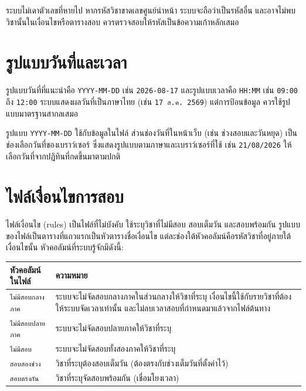 \begin{caution}
ระบบไม่เดาตัวเลขที่หายไป หากรหัสวิชาขาดเลขศูนย์นำหน้า ระบบจะถือว่าเป็นรหัสอื่น
และอาจไม่พบวิชานั้นในเงื่อนไขหรือตารางสอบ ควรตรวจสอบให้รหัสเป็นข้อความเก้าหลักเสมอ
\end{caution}

\section{รูปแบบวันที่และเวลา}

รูปแบบวันที่ที่แนะนำคือ \texttt{YYYY-MM-DD} เช่น \texttt{2026-08-17}
และรูปแบบเวลาคือ \texttt{HH:MM} เช่น \texttt{09:00} ถึง \texttt{12:00}
ระบบแสดงผลวันที่เป็นภาษาไทย (เช่น \texttt{17 ส.ค. 2569}) แต่การป้อนข้อมูล
ควรใช้รูปแบบมาตรฐานสากลเสมอ

\begin{note}
รูปแบบ \texttt{YYYY-MM-DD} ใช้กับข้อมูลในไฟล์ ส่วนช่องวันที่ในหน้าเว็บ
(เช่น ช่วงสอบและวันหยุด) เป็นช่องเลือกวันที่ของเบราว์เซอร์
ซึ่งแสดงรูปแบบตามภาษาและเบราว์เซอร์ที่ใช้ เช่น \texttt{21/08/2026}
ให้เลือกวันที่จากปฏิทินที่กดขึ้นมาตามปกติ
\end{note}

\section{ไฟล์เงื่อนไขการสอบ}

ไฟล์เงื่อนไข (rules) เป็นไฟล์ที่ไม่บังคับ ใช้ระบุวิชาที่ไม่มีสอบ สอบเต็มวัน และสอบพร้อมกัน
รูปแบบของไฟล์เป็นตารางที่แถวแรกเป็นหัวตารางชื่อเงื่อนไข
แต่ละช่องใต้หัวคอลัมน์คือรหัสวิชาที่อยู่ภายใต้เงื่อนไขนั้น
หัวคอลัมน์ที่ระบบรู้จักมีดังนี้:

\begin{longtable}{L{4.5cm}L{10cm}}
\toprule
\textbf{หัวคอลัมน์ในไฟล์} & \textbf{ความหมาย} \\
\midrule
\texttt{ไม่มีสอบกลางภาค} & ระบบจะไม่จัดสอบกลางภาคในส่วนกลางให้วิชาที่ระบุ เงื่อนไขนี้ใช้กับรายวิชาที่ต้องให้ระบบจัดเวลาเท่านั้น และไม่ลบเวลาสอบที่กำหนดมาแล้วจากไฟล์ต้นทาง \\
\texttt{ไม่มีสอบปลายภาค} & ระบบจะไม่จัดสอบปลายภาคให้วิชาที่ระบุ \\
\texttt{ไม่มีสอบ} & ระบบจะไม่จัดสอบทั้งสองภาคให้วิชาที่ระบุ \\
\texttt{สอบสองช่วง} & วิชาที่ระบุต้องสอบเต็มวัน (ต้องตรงกับช่วงเต็มวันที่ตั้งค่าไว้) \\
\texttt{สอบตรงกัน} & วิชาที่ระบุจัดสอบพร้อมกัน (เชื่อมโยงเวลา) \\
\bottomrule
\end{longtable}


